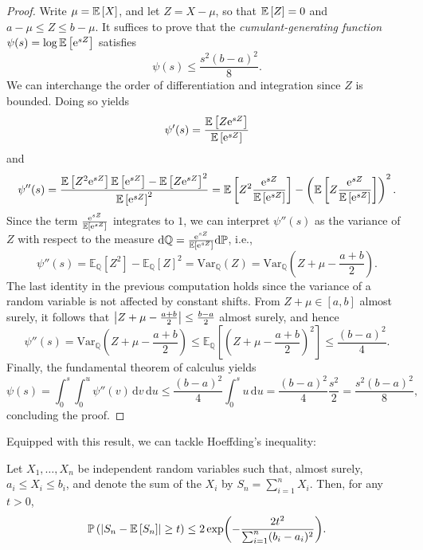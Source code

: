 \begin{proof}
Write $\mu = \mathbb{E}\left[X\right]$, and let $Z = X - \mu$, so that $\mathbb{E}\left[Z\right] = 0$ and $a - \mu \leq Z \leq b - \mu$. It suffices to prove that the \emph{cumulant-generating function} $\psi(s) = \log\mathbb{E}\left[\mathrm{e}^{sZ}\right]$ satisfies
\[
    \psi(s) \leq \frac{s^2(b-a)^2}{8}.
\]
We can interchange the order of differentiation and integration since $Z$ is bounded. Doing so yields
\[
    \psi'(s) = \frac{\mathbb{E}\left[Z\mathrm{e}^{sZ}\right]}{\mathbb{E}\left[\mathrm{e}^{sZ}\right]}
\]
and
\[
    \psi''(s) = \frac{\mathbb{E}\left[Z^2\mathrm{e}^{sZ}\right] \mathbb{E}\left[\mathrm{e}^{sZ}\right] - \mathbb{E}\left[Z\mathrm{e}^{sZ}\right]^2}{\mathbb{E}\left[\mathrm{e}^{sZ}\right]^2} = \mathbb{E}\left[Z^2 \frac{\mathrm{e}^{sZ}}{\mathbb{E}\left[\mathrm{e}^{sZ}\right]}\right] - \left(\mathbb{E}\left[Z \frac{\mathrm{e}^{sZ}}{\mathbb{E}\left[\mathrm{e}^{sZ}\right]}\right]\right)^2.
\]
Since the term $\frac{\mathrm{e}^{sZ}}{\mathbb{E}\left[\mathrm{e}^{sZ}\right]}$ integrates to $1$, we can interpret $\psi''(s)$ as the variance of $Z$ with respect to the measure $\mathrm{d}\mathbb{Q} = \frac{\mathrm{e}^{sZ}}{\mathbb{E}\left[\mathrm{e}^{sZ}\right]} \mathrm{d}\mathbb{P}$, i.e.,
\[
    \psi''(s) = \mathbb{E}_{\mathbb{Q}}[Z^2] - \mathbb{E}_{\mathbb{Q}}[Z]^2 = \mathrm{Var}_{\mathbb{Q}}(Z) = \mathrm{Var}_{\mathbb{Q}}\left(Z + \mu - \frac{a+b}{2}\right).
\]
The last identity in the previous computation holds since the variance of a random variable is not affected by constant shifts. From $Z + \mu \in [a,b]$ almost surely, it follows that $\abs{Z + \mu - \frac{a+b}{2}} \leq \frac{b-a}{2}$ almost surely, and hence
\[
    \psi''(s) = \mathrm{Var}_{\mathbb{Q}}\left(Z + \mu - \frac{a+b}{2}\right) \leq \mathbb{E}_{\mathbb{Q}}\left[\left(Z + \mu - \frac{a+b}{2}\right)^2\right] \leq \frac{(b-a)^2}{4}.
\]
Finally, the fundamental theorem of calculus yields
\[
    \psi(s) = \int_0^s\int_0^u \psi''(v) \, \mathrm{d}v \, \mathrm{d}u \leq \frac{(b-a)^2}{4} \int_0^s u \, \mathrm{d}u = \frac{(b-a)^2}{4} \frac{s^2}{2} = \frac{s^2(b-a)^2}{8},
\]
concluding the proof.
\end{proof}

Equipped with this result, we can tackle Hoeffding's inequality:

\begin{theorem}[Hoeffding, 1963]
\label{thm: hoeffding}
Let $X_1, \dots, X_n$ be independent random variables such that, almost surely, $a_i \leq X_i \leq b_i$, and denote the sum of the $X_i$ by $S_n = \sum_{i=1}^n X_i$. Then, for any $t>0$,
\[
    \mathbb{P}\left(\abs{S_n - \mathbb{E}\left[S_n\right]} \geq t\right) \leq 2 \exp(-\frac{2t^2}{\sum_{i=1}^n (b_i - a_i)^2}).
\]
\end{theorem}

